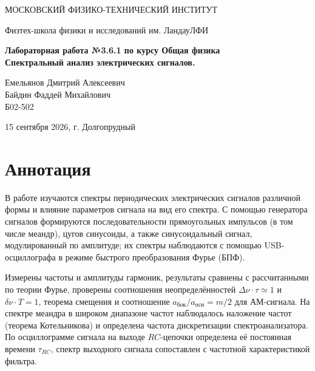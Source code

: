 \documentclass[a4paper,12pt]{article}
\begin{document}
\begin{titlepage}
\begin{center}
    {\large МОСКОВСКИЙ ФИЗИКО-ТЕХНИЧЕСКИЙ ИНСТИТУТ}
\end{center}
\begin{center}
    {\large Физтех-школа физики и исследований им. Ландау\break ЛФИ}
\end{center}

    \vspace{3cm}

\vspace{0.15cm}
{
\begin{center}
    \huge \bf Лабораторная работа №3.6.1 по курсу Общая физика\\
    \vspace{0.4cm}
    \LARGE Спектральный анализ электрических сигналов.
\end{center}
}
\vspace{1.5cm}
\begin{flushright}
Емельянов Дмитрий Алексеевич\\
Байдин Фаддей Михайлович\\
\vspace{0.4cm}
Б02-502
\end{flushright}
\vspace{10cm}
\begin{center}
    \large 15 сентября 2026, г. Долгопрудный
\end{center}
\end{titlepage}

\section{Аннотация}
В работе изучаются спектры периодических электрических сигналов различной
формы и влияние параметров сигнала на вид его спектра. С помощью генератора
сигналов формируются последовательности прямоугольных импульсов (в том числе
меандр), цугов синусоиды, а также синусоидальный сигнал, модулированный по
амплитуде; их спектры наблюдаются с помощью USB-осциллографа в режиме
быстрого преобразования Фурье (БПФ).

Измерены частоты и амплитуды гармоник, результаты
сравнены с рассчитанными по теории Фурье, проверены соотношения
неопределённостей $\Delta\nu\cdot\tau\simeq1$ и $\delta\nu\cdot T=1$,
теорема смещения и соотношение $a_{\text{бок}}/a_{\text{осн}} = m/2$ для
АМ-сигнала. На спектре меандра в широком диапазоне частот наблюдалось
наложение частот (теорема Котельникова) и определена частота дискретизации
спектроанализатора. По осциллограмме сигнала на выходе $RC$-цепочки
определена её постоянная времени $\tau_{RC}$, спектр выходного сигнала
сопоставлен с частотной характеристикой фильтра.
\end{document}

